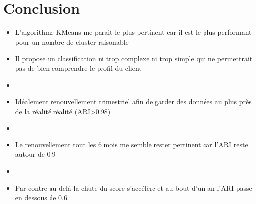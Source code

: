 \documentclass[8pt,aspectratio=169,hyperref={unicode=true}]{beamer}
\begin{document}
\section{Conclusion}
\begin{frame}
    \begin{itemize}
        \item L'algorithme KMeans me parait le plus pertinent car il est le plus performant pour un  nombre de cluster raisonable
        \item Il propose un classification ni trop complexe ni trop simple qui ne permettrait pas de bien comprendre le profil du client
        \item[]
        \item Idéalement renouvellement trimestriel afin de garder des données au plus près de la réalité réalité (ARI>0.98)
        \item[]
        \item Le renouvellement tout les 6 mois me semble rester pertinent car l'ARI reste autour de 0.9
        \item[]
        \item Par contre au delà la chute du score s'accélère et au bout d'un an l'ARI passe en dessous de 0.6
    \end{itemize}
\end{frame}
\end{document}
